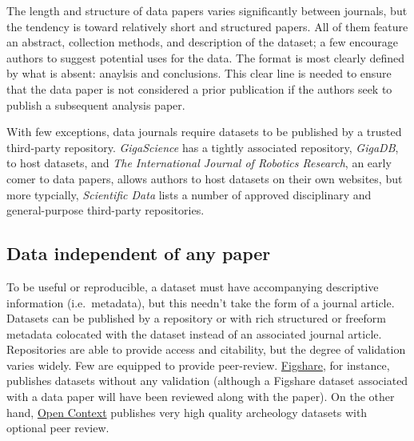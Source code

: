 \documentclass[10pt,a4paper,twocolumn]{article}
\begin{document}
The length and structure of data papers varies significantly between journals, but the tendency is toward relatively short and structured papers.
All of them feature an abstract, collection methods, and description of the dataset; a few \cite{ubiquity_press_metajournals} encourage authors to suggest potential uses for the data.
The format is most clearly defined by what is absent: anaylsis and conclusions.
This clear line is needed to ensure that the data paper is not considered a prior publication if the authors seek to publish a subsequent analysis paper.

With few exceptions, data journals require datasets to be published by a trusted third-party repository. 
\emph{GigaScience} has a tightly associated repository, \emph{GigaDB}, to host datasets, and \emph{The International Journal of Robotics Research}\cite{international_journal_of_robotics_research}, an early comer to data papers, allows authors to host datasets on their own websites, but more typcially, \emph{Scientific Data} lists a number of approved disciplinary and general-purpose third-party repositories.




\subsection*{Data independent of any paper}\label{paper-independent-data}

To be useful or reproducible, a dataset must have accompanying descriptive information (i.e.~metadata), but this needn't take the form of a journal article. 
Datasets can be published by a repository or with rich structured or freeform metadata colocated with the dataset instead of an associated journal article. Repositories are able to provide access and citability, but the degree of validation varies widely. 
Few are equipped to provide peer-review. \href{http://figshare.com/}{Figshare}, for instance, publishes datasets without any validation (although a Figshare dataset associated with a data paper will have been reviewed along with the paper). 
On the other hand, \href{http://opencontext.org/}{Open Context} publishes very high quality archeology datasets with optional peer review.
\end{document}
